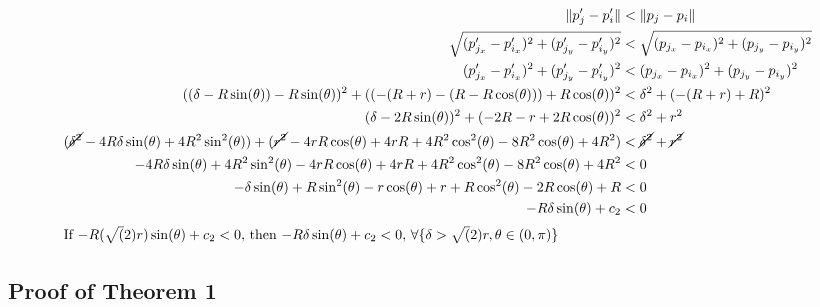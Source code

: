 \documentclass[conference]{IEEEtran}
\begin{document}
    {%
      \setlength{\belowdisplayskip}{3pt}%
      \setlength{\abovedisplayskip}{3pt}%
        \begin{align*}
          \lVert p'_j - p'_i \rVert &< \lVert p_j - p_i \rVert \\
          \sqrt{(p'_{j_x} - p'_{i_x})^2 + (p'_{j_y} - p'_{i_y})^2} &< \sqrt{(p_{j_x} - p_{i_x})^2 + (p_{j_y} - p_{i_y})^2} \\
          (p'_{j_x} - p'_{i_x})^2 + (p'_{j_y} - p'_{i_y})^2 &< (p_{j_x} - p_{i_x})^2 + (p_{j_y} - p_{i_y})^2 \\
          ((\delta - R\sin(\theta)) - R\sin(\theta))^2 + ((-(R+r)-(R-R\cos(\theta))) + R\cos(\theta))^2 &< \delta^2 + (-(R+r) + R)^2 \\
          (\delta - 2R\sin(\theta))^2 + (-2R-r+2R\cos(\theta))^2 &< \delta^2 + r^2 \\
          (\cancel{\delta^2} - 4R\delta\sin(\theta) + 4R^2\sin^2(\theta)) + (\cancel{r^2}-4rR\cos(\theta)+4rR+4R^2\cos^2(\theta)- 8R^2\cos(\theta) + 4R^2) &< \cancel{\delta^2} + \cancel{r^2} \\
          -4R\delta\sin(\theta) + 4R^2\sin^2(\theta) - 4rR\cos(\theta)+4rR+4R^2\cos^2(\theta)- 8R^2\cos(\theta) + 4R^2 &< 0 \\
          -\delta\sin(\theta) + R\sin^2(\theta) - r\cos(\theta) + r + R\cos^2(\theta)- 2R\cos(\theta) + R &< 0 \\
          -R\delta\sin(\theta) + c_2 &< 0 \\
          \intertext{If $-R(\sqrt(2)r)\sin(\theta) + c_2<0$, then $-R\delta\sin(\theta) + c_2<0$, $\forall \{\delta > \sqrt(2)r, \theta\in(0,\pi)\}$}
        \end{align*}
    }


  \subsection{Proof of Theorem 1} \label{thm:1}
\end{document}
